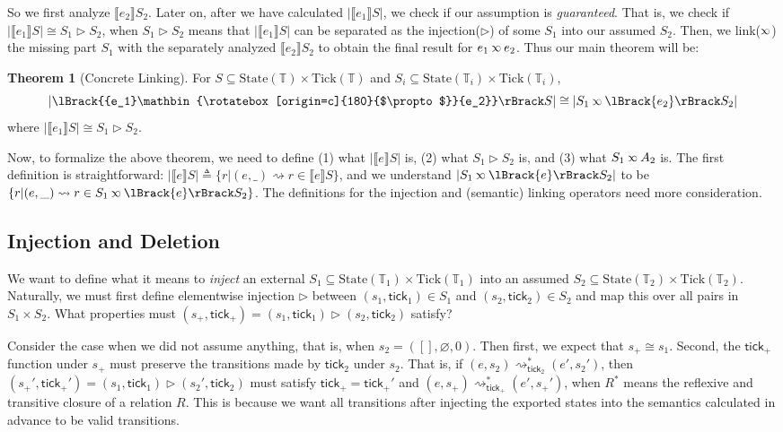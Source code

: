 \documentclass[acmsmall,review]{acmart}\settopmatter{printfolios=true,printccs=false,printacmref=false}
\theoremstyle{definition}
\newtheorem{thm}{Theorem}[section]
\newcommand*{\Time}{\mathbb{T}}
\newcommand*{\State}{\text{State}}
\newcommand*{\Tick}{\text{Tick}}
\newcommand*{\semarrow}{\rightsquigarrow}
\newcommand*{\semlink}{\mathbin{\rotatebox[origin=c]{180}{$\propto$}}}
\newcommand*{\link}[2]{{#1}\semlink{#2}}
\newcommand*{\sembracket}[1]{\lBrack{#1}\rBrack}
\newcommand*{\tick}{\mathsf{tick}}
\begin{document}
So we first analyze $\sembracket{e_2}S_2$.
Later on, after we have calculated $|\sembracket{e_1}S|$, we check if our assumption is \emph{guaranteed}.
That is, we check if $|\sembracket{e_1}S|\cong S_1\rhd S_2$, when $S_1\rhd S_2$ means that $|\sembracket{e_1}S|$ can be {separated} as the {injection}($\rhd$) of some $S_1$ into our assumed $S_2$.
Then, we {link}($\semlink$) the missing part $S_1$ with the separately analyzed $\sembracket{e_2}S_2$ to obtain the final result for $\link{e_1}{e_2}$.
Thus our main theorem will be:
\begin{thm}[Concrete Linking] For $S\subseteq\State(\Time)\times\Tick(\Time)$ and $S_i\subseteq\State(\Time_i)\times\Tick(\Time_i)$,
  \[
    |\sembracket{\link{e_1}{e_2}}S|\cong|S_1\semlink\sembracket{e_2}S_2|
  \]
  where $|\sembracket{e_1}S|\cong S_1\rhd S_2$.
\end{thm}

Now, to formalize the above theorem, we need to define (1) what $|\sembracket{e}S|$ is, (2) what $S_1\rhd S_2$ is, and (3) what $S_1\semlink A_2$ is.
The first definition is straightforward: $|\sembracket{e}S|\triangleq\{r|(e,\_)\semarrow r\in\sembracket{e}S\}$, and we understand $|S_1\semlink\sembracket{e}S_2|$ to be $\{r|(e,\_)\semarrow r\in S_1\semlink\sembracket{e}S_2\}$.
The definitions for the injection and (semantic) linking operators need more consideration.

\subsection{Injection and Deletion}
We want to define what it means to \emph{inject} an external $S_1\subseteq\State(\Time_1)\times\Tick(\Time_1)$ into an assumed $S_2\subseteq\State(\Time_2)\times\Tick(\Time_2)$.
Naturally, we must first define elementwise injection $\rhd$ between $(s_1,\tick_1)\in S_1$ and $(s_2,\tick_2)\in S_2$ and map this over all pairs in $S_1\times S_2$.
What properties must $(s_+,\tick_+)=(s_1,\tick_1)\rhd(s_2,\tick_2)$ satisfy?

Consider the case when we did not assume anything, that is, when $s_2=([],\varnothing,0)$.
Then first, we expect that $s_+\cong s_1$.
Second, the $\tick_+$ function under $s_+$ must preserve the transitions made by $\tick_2$ under $s_2$.
That is, if $(e,s_2)\semarrow_{\tick_2}^*(e',s_2')$, then $(s_+',\tick_+')=(s_1,\tick_1)\rhd(s_2',\tick_2)$ must satisfy
$\tick_+=\tick_+'$ and $(e,s_+)\semarrow_{\tick_+}^*(e',s_+')$, when $R^*$ means the reflexive and transitive closure of a relation $R$.
This is because we want all transitions after injecting the exported states into the semantics calculated in advance to be valid transitions.
\end{document}
